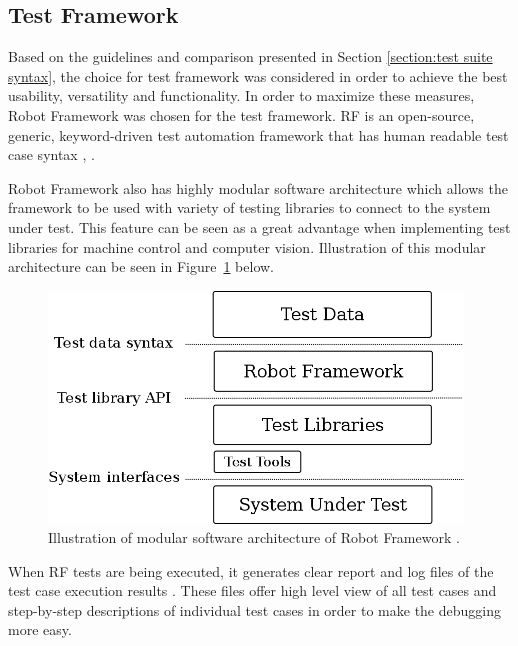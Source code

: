 \FloatBarrier
\subsection{Test Framework}
\label{subsection:test framework}

Based on the guidelines and comparison presented in Section \ref{section:test suite syntax}, the choice for test framework was considered in order to achieve the best usability, versatility and functionality. In order to maximize these measures, Robot Framework was chosen for the test framework. RF is an open-source, generic, keyword-driven test automation framework that has human readable test case syntax \citep{Rfuserguide}, \citep{robotframework}.

Robot Framework also has highly modular software architecture \citep{Rfuserguide} which allows the framework to be used with variety of testing libraries to connect to the system under test. This feature can be seen as a great advantage when implementing test libraries for machine control and computer vision. Illustration of this modular architecture can be seen in Figure~\ref{fig:modular_architecture} below.

\begin{figure}[ht]
  \begin{center}
    \includegraphics[width=11cm]{images/architecture-big.png}
    \caption{Illustration of modular software architecture of Robot Framework \citep{rf-architecture}.}
    \label{fig:modular_architecture}
  \end{center}
\end{figure}
\FloatBarrier

When RF tests are being executed, it generates clear report and log files of the test case execution results \citep{Rfuserguide}. These files offer high level view of all test cases and step-by-step descriptions of individual test cases in order to make the debugging more easy.

